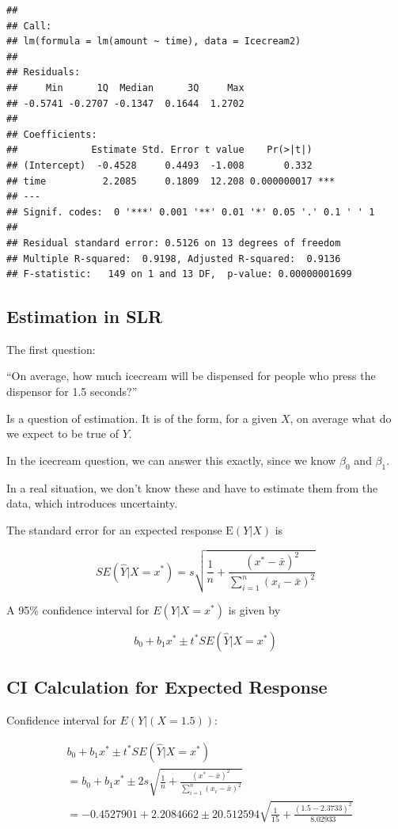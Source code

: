 \documentclass[]{book}
\begin{document}
\begin{verbatim}
## 
## Call:
## lm(formula = lm(amount ~ time), data = Icecream2)
## 
## Residuals:
##     Min      1Q  Median      3Q     Max 
## -0.5741 -0.2707 -0.1347  0.1644  1.2702 
## 
## Coefficients:
##             Estimate Std. Error t value    Pr(>|t|)    
## (Intercept)  -0.4528     0.4493  -1.008       0.332    
## time          2.2085     0.1809  12.208 0.000000017 ***
## ---
## Signif. codes:  0 '***' 0.001 '**' 0.01 '*' 0.05 '.' 0.1 ' ' 1
## 
## Residual standard error: 0.5126 on 13 degrees of freedom
## Multiple R-squared:  0.9198, Adjusted R-squared:  0.9136 
## F-statistic:   149 on 1 and 13 DF,  p-value: 0.00000001699
\end{verbatim}

\subsection{Estimation in SLR}\label{estimation-in-slr}

The first question:

``On average, how much icecream will be dispensed for people who press
the dispensor for 1.5 seconds?''

Is a question of estimation. It is of the form, for a given \(X\), on
average what do we expect to be true of \(Y\).

In the icecream question, we can answer this exactly, since we know
\(\beta_0\) and \(\beta_1\).

In a real situation, we don't know these and have to estimate them from
the data, which introduces uncertainty.

The standard error for an expected response \(\text{E}(Y|X)\) is

\[
SE(\hat{Y}|X=x^*) = s\sqrt{\frac{1}{n}+ \frac{(x^*-\bar{x})^2}{\displaystyle\sum_{i=1}^n(x_i-\bar{x})^2}}
\]

A 95\% confidence interval for \(E(Y|X=x^*)\) is given by

\[
b_0+b_1x^* \pm t^*SE(\hat{Y}|X=x^*)
\]

\subsection{CI Calculation for Expected
Response}\label{ci-calculation-for-expected-response}

Confidence interval for \(E(Y | (X=1.5))\):

\[
\begin{aligned}
& b_0+b_1x^* \pm t^*SE(\hat{Y}|X=x^*) \\
& = b_0+b_1x^* \pm 2s\sqrt{\frac{1}{n}+ \frac{(x^*-\bar{x})^2}{\displaystyle\sum_{i=1}^n(x_i-\bar{x})^2}}  \\
& = -0.4527901 + 2.2084662 \pm 20.512594 \sqrt{\frac{1}{15}+ \frac{(1.5-2.3733)^2}{8.02933}}
\end{aligned}
\]
\end{document}
